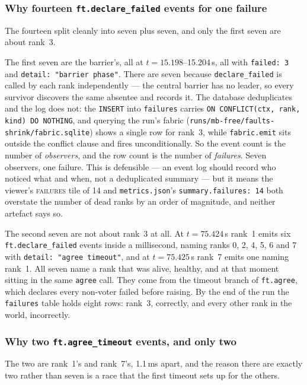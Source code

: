\documentclass[11pt]{article}
\begin{document}
\subsubsection*{Why fourteen \texttt{ft.declare\_failed} events for one failure}

The fourteen split cleanly into seven plus seven, and only the first seven are about
rank~3.

The first seven are the barrier's, all at $t=15.198$--15.204\,s, all with
\texttt{failed:\ 3} and \texttt{detail:\ "barrier phase"}. There are seven because
\texttt{declare\_failed} is called by each rank independently --- the central barrier has
no leader, so every survivor discovers the same absentee and records it. The database
deduplicates and the log does not: the \texttt{INSERT} into \texttt{failures} carries
\texttt{ON CONFLICT(ctx, rank, kind) DO NOTHING}, and querying the run's fabric
(\texttt{runs/mb-free/faults-shrink/fabric.sqlite}) shows a single row for rank~3, while
\texttt{fabric.emit} sits outside the conflict clause and fires unconditionally. So the
event count is the number of \emph{observers}, and the row count is the number of
\emph{failures}. Seven observers, one failure. This is defensible --- an event log should
record who noticed what and when, not a deduplicated summary --- but it means the
viewer's \textsc{failures} tile of 14 and \texttt{metrics.json}'s
\texttt{summary.failures: 14} both overstate the number of dead ranks by an order of
magnitude, and neither artefact says so.

The second seven are not about rank~3 at all. At $t=75.424$\,s rank~1 emits six
\texttt{ft.declare\_failed} events inside a millisecond, naming ranks 0, 2, 4, 5, 6 and 7 with
\texttt{detail:\ "agree timeout"}, and at $t=75.425$\,s rank~7 emits one naming rank~1.
All seven name a rank that was alive, healthy, and at that moment sitting in the same
\texttt{agree} call. They come from the timeout branch of \texttt{ft.agree}, which
declares every non-voter failed before raising. By the end of the run the
\texttt{failures} table holds eight rows: rank~3, correctly, and every other rank in the
world, incorrectly.

\subsubsection*{Why two \texttt{ft.agree\_timeout} events, and only two}

The two are rank~1's and rank~7's, 1.1\,ms apart, and the reason there are exactly two
rather than seven is a race that the first timeout sets up for the others.
\end{document}
